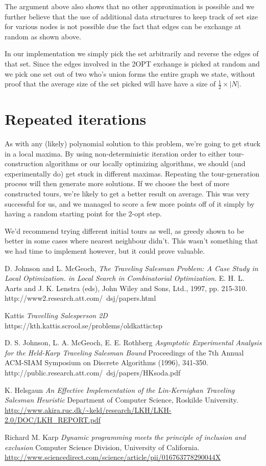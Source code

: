 \documentclass[a4paper,12pt,oneside]{article}
\begin{document}
The argument above also shows that no other approximation is possible and we further believe that the use of additional data structures to keep track of set size for various nodes is not possible due the fact that edges can be exchange at random as shown above.

In our implementation we simply pick the set arbitrarily and reverse the edges of that set. Since the edges involved in the 2OPT exchange is picked at random and we pick one set out of two who's union forms the entire graph we state, without proof that the average size of the set picked will have have a size of $\frac{1}{2} \times |N|$.


\section{Repeated iterations}

As with any (likely) polynomial solution to this problem, we're going to get stuck in a local maxima. By using non-deterministic iteration order to either tour-construction algorithms or our locally optimizing algorithms, we should (and experimentally do) get stuck in different maximas. Repeating the tour-generation process will then generate more solutions. If we choose the best of more constructed tours, we're likely to get a better result on average. This was very successful for us, and we managed to score a few more points off of it simply by having a random starting point for the 2-opt step.

We'd recommend trying different initial tours as well, as greedy shown to be better in some cases where nearest neighbour didn't. This wasn't something that we had time to implement however, but it could prove valuable.

\begin{thebibliography}{9}

	D. Johnson and L. McGeoch,
	\emph{The Traveling Salesman Problem: A Case Study in Local Optimization. in Local Search in Combinatorial Optimization}.
	E. H. L. Aarts and J. K. Lenstra (eds), John Wiley and Sons, Ltd., 1997, pp. 215-310. http://www2.research.att.com/~dsj/papers.html

	Kattis
	\emph{Travelling Salesperson 2D}
	https://kth.kattis.scrool.se/problems/oldkattis:tsp

	D. S. Johnson, L. A. McGeoch, E. E. Rothberg
	\emph{Asymptotic Experimental Analysis for the Held-Karp Traveling Salesman Bound}
	Proceedings of the 7th Annual ACM-SIAM Symposium on Discrete Algorithms (1996), 341-350. http://public.research.att.com/~dsj/papers/HKsoda.pdf

	K. Helsgaun
	\emph{An Effective Implementation of the Lin-Kernighan Traveling Salesman Heuristic}
	Department of Computer Science, Roskilde University.
	\url{http://www.akira.ruc.dk/~keld/research/LKH/LKH-2.0/DOC/LKH_REPORT.pdf}

	Richard M. Karp
	\emph{Dynamic programming meets the principle of inclusion and exclusion}
	Computer Science Division, University of California.
	\url{http://www.sciencedirect.com/science/article/pii/016763778290044X}
	
\end{thebibliography}
\end{document}
